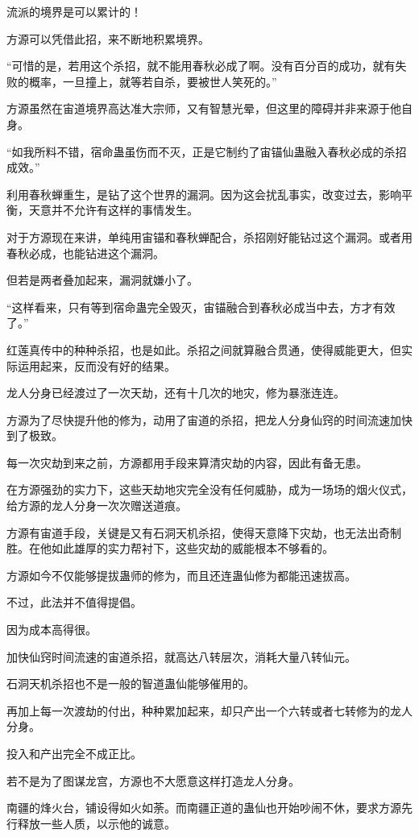 \begin{this_body}
流派的境界是可以累计的！

方源可以凭借此招，来不断地积累境界。

“可惜的是，若用这个杀招，就不能用春秋必成了啊。没有百分百的成功，就有失败的概率，一旦撞上，就等若自杀，要被世人笑死的。”

方源虽然在宙道境界高达准大宗师，又有智慧光晕，但这里的障碍并非来源于他自身。

“如我所料不错，宿命蛊虽伤而不灭，正是它制约了宙锚仙蛊融入春秋必成的杀招成效。”

利用春秋蝉重生，是钻了这个世界的漏洞。因为这会扰乱事实，改变过去，影响平衡，天意并不允许有这样的事情发生。

对于方源现在来讲，单纯用宙锚和春秋蝉配合，杀招刚好能钻过这个漏洞。或者用春秋必成，也能钻进这个漏洞。

但若是两者叠加起来，漏洞就嫌小了。

“这样看来，只有等到宿命蛊完全毁灭，宙锚融合到春秋必成当中去，方才有效了。”

红莲真传中的种种杀招，也是如此。杀招之间就算融合贯通，使得威能更大，但实际运用起来，反而没有好的结果。

龙人分身已经渡过了一次天劫，还有十几次的地灾，修为暴涨连连。

方源为了尽快提升他的修为，动用了宙道的杀招，把龙人分身仙窍的时间流速加快到了极致。

每一次灾劫到来之前，方源都用手段来算清灾劫的内容，因此有备无患。

在方源强劲的实力下，这些天劫地灾完全没有任何威胁，成为一场场的烟火仪式，给方源的龙人分身一次次赠送道痕。

方源有宙道手段，关键是又有石洞天机杀招，使得天意降下灾劫，也无法出奇制胜。在他如此雄厚的实力帮衬下，这些灾劫的威能根本不够看的。

方源如今不仅能够提拔蛊师的修为，而且还连蛊仙修为都能迅速拔高。

不过，此法并不值得提倡。

因为成本高得很。

加快仙窍时间流速的宙道杀招，就高达八转层次，消耗大量八转仙元。

石洞天机杀招也不是一般的智道蛊仙能够催用的。

再加上每一次渡劫的付出，种种累加起来，却只产出一个六转或者七转修为的龙人分身。

投入和产出完全不成正比。

若不是为了图谋龙宫，方源也不大愿意这样打造龙人分身。

南疆的烽火台，铺设得如火如荼。而南疆正道的蛊仙也开始吵闹不休，要求方源先行释放一些人质，以示他的诚意。


\end{this_body}
